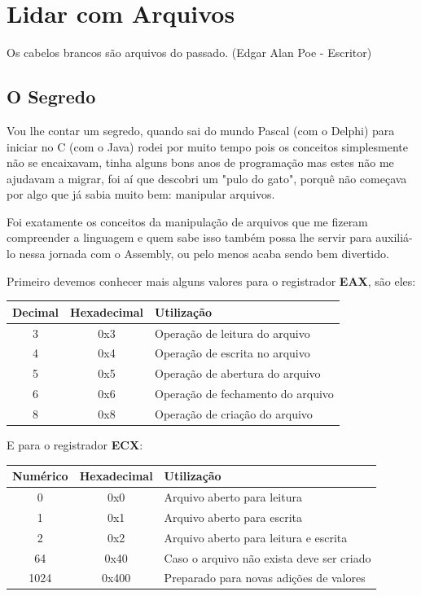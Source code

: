 \chapter{Lidar com Arquivos}

\begin{remark}
	Os cabelos brancos são arquivos do passado. (Edgar Alan Poe - Escritor) 
\end{remark}

\section{O Segredo}
Vou lhe contar um segredo, quando sai do mundo Pascal (com o Delphi) para iniciar no C (com o Java) rodei por muito tempo pois os conceitos simplesmente não se encaixavam, tinha alguns bons anos de programação mas estes não me ajudavam a migrar, foi aí que descobri um "pulo do gato", porquê não começava por algo que já sabia muito bem: manipular arquivos.

Foi exatamente os conceitos da manipulação de arquivos que me fizeram compreender a linguagem e quem sabe isso também possa lhe servir para auxiliá-lo nessa jornada com o Assembly, ou pelo menos acaba sendo bem divertido.

Primeiro devemos conhecer mais alguns valores para o registrador \textbf{EAX}, são eles:
\begin{table}[H]
	\centering 
	\begin{tabular}{c | c | l }
		\textbf{Decimal} & \textbf{Hexadecimal} & \textbf{Utilização} \\ \hline 
		3 & 0x3 & Operação de leitura do arquivo \\
		4 & 0x4 & Operação de escrita no arquivo \\
		5 & 0x5 & Operação de abertura do arquivo \\
		6 & 0x6 & Operação de fechamento do arquivo \\
		8 & 0x8 & Operação de criação do arquivo
	\end{tabular}
\end{table}

E para o registrador \textbf{ECX}:
\begin{table}[H]
	\centering 
	\begin{tabular}{c | c | l }
		\textbf{Numérico} & \textbf{Hexadecimal} & \textbf{Utilização} \\ \hline 
		0 & 0x0 & Arquivo aberto para leitura \\
		1 & 0x1 & Arquivo aberto para escrita \\
		2 & 0x2 & Arquivo aberto para leitura e escrita \\
		64 & 0x40 & Caso o arquivo não exista deve ser criado \\
		1024 & 0x400 & Preparado para novas adições de valores
	\end{tabular}
\end{table}

